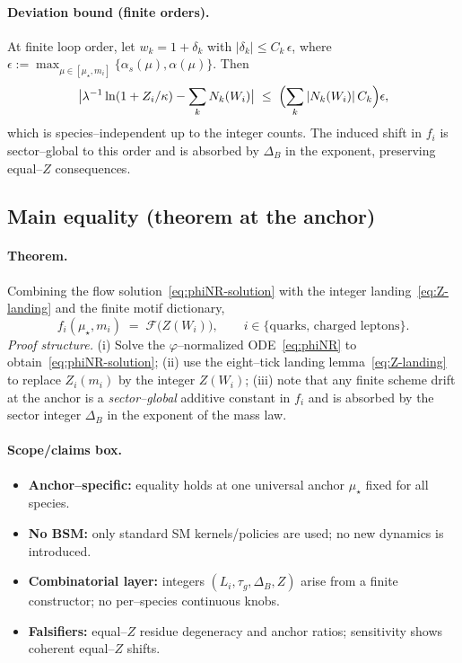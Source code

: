 \documentclass[epjc3]{svjour3}
\begin{document}
\paragraph{Deviation bound (finite orders).}
At finite loop order, let $w_k=1+\delta_k$ with $|\delta_k|\le C_k\,\epsilon$, where $\epsilon:=\max_{\mu\in[\mu_\star,m_i]}\{\alpha_s(\mu),\alpha(\mu)\}$. Then
\[
  \bigl|\lambda^{-1}\ln(1+Z_i/\kappa)-\sum_k N_k(W_i)\bigr|\;\le\;\Bigl(\sum_k |N_k(W_i)|\,C_k\Bigr)\epsilon,
\]
which is species--independent up to the integer counts. The induced shift in $f_i$ is sector--global to this order and is absorbed by $\Delta_B$ in the exponent, preserving equal--$Z$ consequences.

\subsection{Main equality (theorem at the anchor)}

\paragraph{Theorem.}
Combining the flow solution~\eqref{eq:phiNR-solution} with the integer landing~\eqref{eq:Z-landing} and the finite motif dictionary,
\begin{equation}
  \boxed{\qquad
  f_i(\mu_\star,m_i)
  \;=\;
  \mathcal F\!\bigl(Z(W_i)\bigr),
  \qquad i\in\{\text{quarks, charged leptons}\}.
  \qquad}
  \label{eq:main-theorem}
\end{equation}
\emph{Proof structure.} (i) Solve the $\varphi$--normalized ODE~\eqref{eq:phiNR} to obtain~\eqref{eq:phiNR-solution}; (ii) use the eight--tick landing lemma~\eqref{eq:Z-landing} to replace $Z_i(m_i)$ by the integer $Z(W_i)$; (iii) note that any finite scheme drift at the anchor is a \emph{sector--global} additive constant in $f_i$ and is absorbed by the sector integer $\Delta_B$ in the exponent of the mass law.

\paragraph{Scope/claims box.}
\begin{itemize}
  \item \textbf{Anchor--specific:} equality holds at one universal anchor $\mu_\star$ fixed for all species.
  \item \textbf{No BSM:} only standard SM kernels/policies are used; no new dynamics is introduced.
  \item \textbf{Combinatorial layer:} integers $(L_i,\tau_g,\Delta_B,Z)$ arise from a finite constructor; no per--species continuous knobs.
  \item \textbf{Falsifiers:} equal--$Z$ residue degeneracy and anchor ratios; sensitivity shows coherent equal--$Z$ shifts.
\end{itemize}
\end{document}
